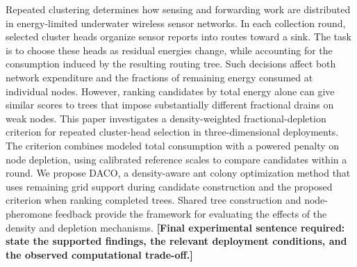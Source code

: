 Repeated clustering determines how sensing and forwarding work are
distributed in energy-limited underwater wireless sensor networks.
In each collection round, selected cluster heads organize sensor reports
into routes toward a sink.
The task is to choose these heads as residual energies change, while
accounting for the consumption induced by the resulting routing tree.
Such decisions affect both network expenditure and the fractions of
remaining energy consumed at individual nodes.
However, ranking candidates by total energy alone can give similar scores
to trees that impose substantially different fractional drains on weak nodes.
This paper investigates a density-weighted fractional-depletion criterion
for repeated cluster-head selection in three-dimensional deployments.
The criterion combines modeled total consumption with a powered penalty
on node depletion, using calibrated reference scales to compare candidates
within a round.
We propose DACO, a density-aware ant colony optimization method that uses
remaining grid support during candidate construction and the proposed
criterion when ranking completed trees.
Shared tree construction and node-pheromone feedback provide the framework
for evaluating the effects of the density and depletion mechanisms.
\textbf{[Final experimental sentence required: state the supported findings,
the relevant deployment conditions, and the observed computational trade-off.]}
